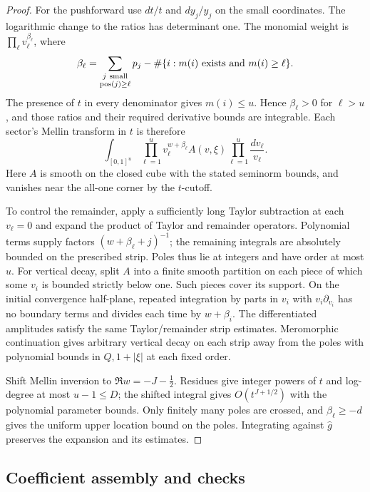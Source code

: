 \begin{proof}
For the pushforward use \(dt/t\) and \(dy_j/y_j\) on the small
coordinates. The logarithmic change to the ratios has
determinant one. The monomial weight is
\(\prod_\ell v_\ell^{\beta_\ell}\), where
\begin{equation}
 \beta_\ell=\sum_{\substack{j\ {\rm small}\\{\rm pos}(j)\ge\ell}}p_j
    -\#\{i:m(i)\text{ exists and }m(i)\ge\ell\}.
 \label{rad:beta}
\end{equation}
The presence of \(t\) in every denominator gives \(m(i)\le u\).
Hence \(\beta_\ell>0\) for \(\ell>u\), and those ratios and
their required derivative bounds are integrable. Each sector's
Mellin transform in \(t\) is therefore
\begin{equation}
 \int_{[0,1]^u}\prod_{\ell=1}^{u}v_\ell^{w+\beta_\ell}
          A(v,\xi)\prod_{\ell=1}^{u}\frac{dv_\ell}{v_\ell}.
 \label{rad:mellin}
\end{equation}
Here \(A\) is smooth on the closed cube with the stated
seminorm bounds, and vanishes near the all-one corner by the
\(t\)-cutoff.

To control the remainder, apply a sufficiently long Taylor
subtraction at each \(v_\ell=0\) and expand the product of
Taylor and remainder operators. Polynomial terms supply
factors \((w+\beta_\ell+j)^{-1}\); the remaining integrals
are absolutely bounded on the prescribed strip. Poles thus
lie at integers and have order at most \(u\).
For vertical decay, split \(A\) into a finite smooth partition
on each piece of which some \(v_i\) is bounded strictly below
one. Such pieces cover its support. On the initial convergence
half-plane, repeated integration by parts in \(v_i\) with
\(v_i\partial_{v_i}\) has no boundary terms and divides each
time by \(w+\beta_i\). The differentiated amplitudes satisfy
the same Taylor/remainder strip estimates. Meromorphic
continuation gives arbitrary vertical decay on each strip
away from the poles with polynomial bounds in \(Q,1+|\xi|\)
at each fixed order.

Shift Mellin inversion to \(\Re w=-J-\tfrac12\). Residues
give integer powers of \(t\) and log-degree at most
\(u-1\le D\); the shifted integral gives \(O(t^{J+1/2})\)
with the polynomial parameter bounds. Only finitely many
poles are crossed, and \(\beta_\ell\ge-d\) gives the uniform
upper location bound on the poles. Integrating against
\(\widehat g\) preserves the expansion and its estimates.
\end{proof}

\subsection{Coefficient assembly and checks}
\label{rad:checks}

